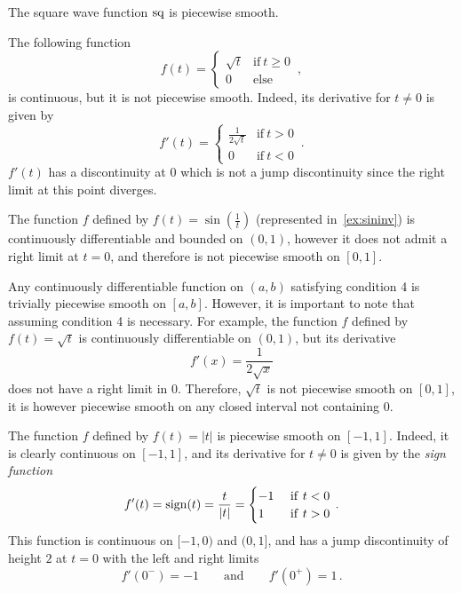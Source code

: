 \begin{example}
  The square wave function $\operatorname{sq}$ is piecewise smooth.
\end{example}
\begin{example}
  The following function
  \begin{equation}
    f(t)=
    \begin{cases}
      \sqrt{t} & \text{if}~t\geq 0\\
      0 & \text{else}
    \end{cases}\,,
  \end{equation}
  is continuous, but it is not piecewise smooth. Indeed, its derivative for $t\neq 0$ is given
  by
  \begin{equation}
    f'(t)=
    \begin{cases}
      \frac{1}{2\sqrt{t}} & \text{if}~t>0\\
      0 & \text{if}~t<0
    \end{cases}\,.
  \end{equation}
  $f'(t)$ has a discontinuity at $0$ which is not a jump discontinuity since the right limit at this point diverges.
\end{example}
\begin{example}
  \label{ex:sininv}
  The function $f$ defined by $f(t)=\sin(\frac{1}{t})$ (represented in~\cref{ex:sininv})
  is continuously differentiable and bounded on $(0,1)$, however it does not admit a right
  limit at $t=0$, and therefore is not piecewise smooth on $[0,1]$.
\end{example}
\begin{example}
  Any continuously differentiable function on $(a,b)$ satisfying condition 4 is trivially
  piecewise smooth on $[a,b]$. However, it is important to note that assuming condition 4 is
  necessary. For example, the function $f$ defined by $f(t)=\sqrt{t}$ is continuously
  differentiable on $(0,1)$, but its derivative
  \begin{equation}
    f'(x)=\frac{1}{2\sqrt{x}}
  \end{equation}
  does not have a right limit in $0$. Therefore, $\sqrt{t}$ is not piecewise smooth on
  $[0,1]$, it is however piecewise smooth on any closed interval not containing $0$.
\end{example}
\begin{example}
  The function $f$ defined by $f(t)=|t|$ is piecewise smooth on $[-1,1]$. Indeed, it is
  clearly continuous on $[-1,1]$, and its derivative for $t\neq 0$ is given by the
  \emph{sign function}
  \begin{equation}
    f'(t)=\operatorname{sign}(t)=\frac{t}{|t|}=
    \begin{cases}
      -1&~\mathrm{if}~t<0\\
      1&~\mathrm{if}~t>0
    \end{cases}\,.
  \end{equation}
  This function is continuous on $[-1,0)$ and $(0,1]$, and has a jump discontinuity of height $2$ at
  $t=0$ with the left and right limits
  \begin{equation}
    f'(0^-)=-1\qquad\text{and}\qquad f'(0^+)=1\,.
  \end{equation}
\end{example}
